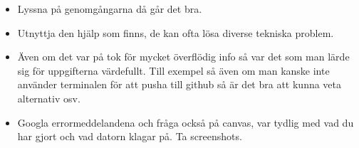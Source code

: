 \begin{itemize}
  \item Lyssna på genomgångarna då går det bra.
  \item Utnyttja den hjälp som finns, de kan ofta lösa diverse tekniska 
    problem.
  \item Även om det var på tok för mycket överflödig info så var det som man 
    lärde sig för uppgifterna värdefullt. Till exempel så även om man kanske
    inte använder terminalen för att pusha till github så är det bra att kunna 
    veta alternativ osv.
  \item Googla errormeddelandena och fråga också på canvas, var tydlig med vad 
    du har gjort och vad datorn klagar på. Ta screenshots.
\end{itemize}
